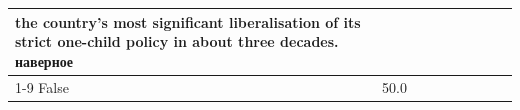 \begin{table}[H]
\begin{tabular}{lllrlllll}
the country's most significant liberalisation of its strict one-child policy in about three decades. наверное \\
\cline{1-9}
False & 50.0%
\end{tabular}
\end{table}
